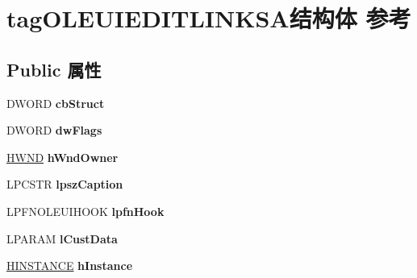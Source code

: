 \hypertarget{structtag_o_l_e_u_i_e_d_i_t_l_i_n_k_s_a}{}\section{tag\+O\+L\+E\+U\+I\+E\+D\+I\+T\+L\+I\+N\+K\+S\+A结构体 参考}
\label{structtag_o_l_e_u_i_e_d_i_t_l_i_n_k_s_a}
\subsection*{Public 属性}
\begin{DoxyCompactItemize}
\item 
\mbox{\label{structtag_o_l_e_u_i_e_d_i_t_l_i_n_k_s_a_ad5a972fd9785d7c04b684e94e2e599c7}} 
D\+W\+O\+RD {\bfseries cb\+Struct}
\item 
\mbox{\label{structtag_o_l_e_u_i_e_d_i_t_l_i_n_k_s_a_acdf84d4af8b84584c007bf5877bb3aae}} 
D\+W\+O\+RD {\bfseries dw\+Flags}
\item 
\mbox{\label{structtag_o_l_e_u_i_e_d_i_t_l_i_n_k_s_a_acf2b6c28f016f0d8024cdf089b17486b}} 
\hyperlink{interfacevoid}{H\+W\+ND} {\bfseries h\+Wnd\+Owner}
\item 
\mbox{\label{structtag_o_l_e_u_i_e_d_i_t_l_i_n_k_s_a_aa2668f0f21c192279caf377bc208f206}} 
L\+P\+C\+S\+TR {\bfseries lpsz\+Caption}
\item 
\mbox{\label{structtag_o_l_e_u_i_e_d_i_t_l_i_n_k_s_a_a94e99347ceaf6ea0793b3703352864d4}} 
L\+P\+F\+N\+O\+L\+E\+U\+I\+H\+O\+OK {\bfseries lpfn\+Hook}
\item 
\mbox{\label{structtag_o_l_e_u_i_e_d_i_t_l_i_n_k_s_a_a42d87d7b9cab807965c78d79496a4633}} 
L\+P\+A\+R\+AM {\bfseries l\+Cust\+Data}
\item 
\mbox{\label{structtag_o_l_e_u_i_e_d_i_t_l_i_n_k_s_a_a2451293b28c036eedad74344da5fbe6f}} 
\hyperlink{interfacevoid}{H\+I\+N\+S\+T\+A\+N\+CE} {\bfseries h\+Instance}

\end{DoxyCompactItemize}
